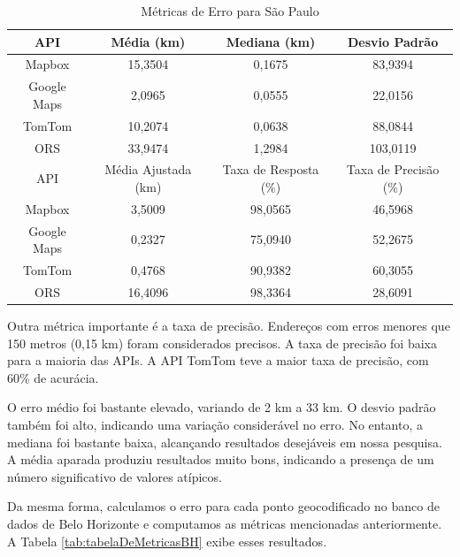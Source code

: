 \begin{table}[!ht]
\centering
\caption{Métricas de Erro para São Paulo}
\label{tab:tabelaDeMetricasSP}
\begin{adjustbox}{width=0.7\textwidth}
\begin{tabular}{|c|c|c|c|}
\hline
API & Média (km) & Mediana (km) & Desvio Padrão \\
\hline
Mapbox & 15,3504 & 0,1675 & 83,9394 \\
Google Maps & 2,0965 & 0,0555 & 22,0156 \\
TomTom & 10,2074 & 0,0638 & 88,0844 \\
ORS & 33,9474 & 1,2984 & 103,0119 \\
\hline
\hline
API & Média Ajustada (km) & Taxa de Resposta (\%) & Taxa de Precisão (\%) \\
\hline
Mapbox & 3,5009 & 98,0565 & 46,5968 \\
Google Maps & 0,2327 & 75,0940 & 52,2675 \\
TomTom & 0,4768 & 90,9382 & 60,3055 \\
ORS & 16,4096 & 98,3364 & 28,6091 \\
\hline
\end{tabular}
\end{adjustbox}
\end{table}

Outra métrica importante é a taxa de precisão. Endereços com erros menores que 150 metros (0,15 km) foram considerados precisos. A taxa de precisão foi baixa para a maioria das APIs. A API TomTom teve a maior taxa de precisão, com 60\% de acurácia.

O erro médio foi bastante elevado, variando de 2 km a 33 km. O desvio padrão também foi alto, indicando uma variação considerável no erro. No entanto, a mediana foi bastante baixa, alcançando resultados desejáveis em nossa pesquisa. A média aparada produziu resultados muito bons, indicando a presença de um número significativo de valores atípicos.

Da mesma forma, calculamos o erro para cada ponto geocodificado no banco de dados de Belo Horizonte e computamos as métricas mencionadas anteriormente. A Tabela \ref{tab:tabelaDeMetricasBH} exibe esses resultados.

